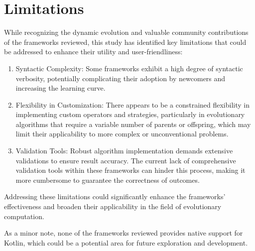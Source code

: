 \section{Limitations}
\label{sec:sota:limitations}
  While recognizing the dynamic evolution and valuable community contributions of the frameworks reviewed, this study has identified key limitations that could be addressed to enhance their utility and user-friendliness:

  \begin{enumerate}
    \item Syntactic Complexity: Some frameworks exhibit a high degree of syntactic verbosity, potentially complicating their adoption by newcomers and increasing the learning curve.
    \item Flexibility in Customization: There appears to be a constrained flexibility in implementing custom operators and strategies, particularly in evolutionary algorithms that require a variable number of parents or offspring, which may limit their applicability to more complex or unconventional problems.
    \item Validation Tools: Robust algorithm implementation demands extensive validations to ensure result accuracy. The current lack of comprehensive validation tools within these frameworks can hinder this process, making it more cumbersome to guarantee the correctness of outcomes.
  \end{enumerate}

  Addressing these limitations could significantly enhance the frameworks' effectiveness and broaden their applicability in the field of evolutionary computation.

  As a minor note, none of the frameworks reviewed provides native support for Kotlin, which could be a potential area for future exploration and development.